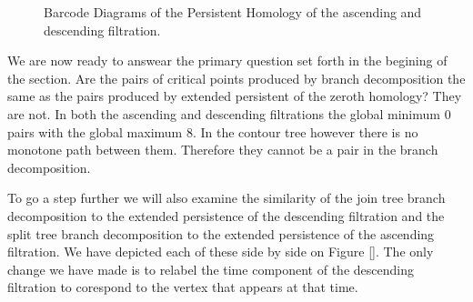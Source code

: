 \begin{figure}[h]%
    \centering
    \qquad \qquad

    \caption{Barcode Diagrams of the Persistent Homology of the ascending and descending filtration.}%
    \label{fig:barcode-asc-desc}%
\end{figure}

We are now ready to answear the primary question set forth in the begining of the section. Are the pairs of critical points produced by branch decomposition the same as the pairs produced by extended persistent of the zeroth homology? They are not. In both the ascending and descending filtrations the global minimum $0$ pairs with the global maximum $8$. In the contour tree however there is no monotone path between them. Therefore they cannot be a pair in the branch decomposition.

To go a step further we will also examine the similarity of the join tree branch decomposition to the extended persistence of the descending filtration and the split tree branch decomposition to the extended persistence of the ascending filtration. We have depicted each of these side by side on Figure []. The only change we have made is to relabel the time component of the descending filtration to corespond to the vertex that appears at that time.

